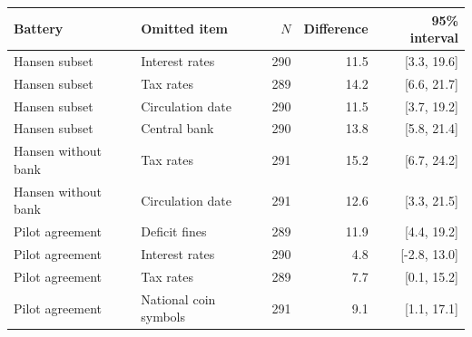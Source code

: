\begin{tabular}{llrrr}
\toprule
Battery & Omitted item & $N$ & Difference & 95\% interval \\
\midrule
Hansen subset & Interest rates & 290 & 11.5 & [3.3, 19.6] \\
Hansen subset & Tax rates & 289 & 14.2 & [6.6, 21.7] \\
Hansen subset & Circulation date & 290 & 11.5 & [3.7, 19.2] \\
Hansen subset & Central bank & 290 & 13.8 & [5.8, 21.4] \\
Hansen without bank & Tax rates & 291 & 15.2 & [6.7, 24.2] \\
Hansen without bank & Circulation date & 291 & 12.6 & [3.3, 21.5] \\
Pilot agreement & Deficit fines & 289 & 11.9 & [4.4, 19.2] \\
Pilot agreement & Interest rates & 290 & 4.8 & [-2.8, 13.0] \\
Pilot agreement & Tax rates & 289 & 7.7 & [0.1, 15.2] \\
Pilot agreement & National coin symbols & 291 & 9.1 & [1.1, 17.1] \\
\bottomrule
\end{tabular}
